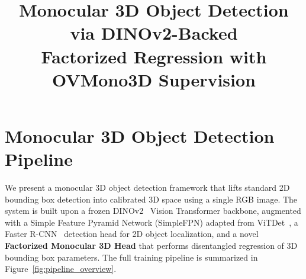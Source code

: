 \documentclass[runningheads]{llncs}
\begin{document}
\title{Monocular 3D Object Detection via DINOv2-Backed\\Factorized Regression with OVMono3D Supervision}

\author{}
\institute{}

\maketitle

\section{Monocular 3D Object Detection Pipeline}
\label{sec:mono3d_pipeline}

We present a monocular 3D object detection framework that lifts standard 2D bounding box detection into calibrated 3D space using a single RGB image.
The system is built upon a frozen DINOv2~\cite{oquab2024dinov2} Vision Transformer backbone, augmented with a Simple Feature Pyramid Network (SimpleFPN) adapted from ViTDet~\cite{li2022vitdet}, a Faster R-CNN~\cite{ren2015fasterrcnn} detection head for 2D object localization, and a novel \textbf{Factorized Monocular 3D Head} that performs disentangled regression of 3D bounding box parameters.
The full training pipeline is summarized in Figure~\ref{fig:pipeline_overview}.
\end{document}
